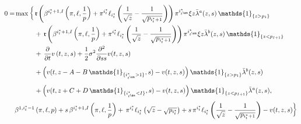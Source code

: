 \documentclass[8pt]{article}
\begin{document}
\begin{equation}
\begin{aligned}
    0 = & \max \bigg\{\,\mathfrak{r}\left( \beta^{i^\star_t+1,I} \left(\pi, \ell, \frac{1}{p} \right) + \pi^{i^\star_t} \ell_{i^\star_t}\left(\frac{1}{\sqrt{z}}-\frac{1}{\sqrt{p_{i^\star_t +1}}}\right) \right) \pi^{i^\star_{t^\sm}} \xi z \bar{\lambda}^a(z,s) \, \mathds{1}_{\{z > p_1\}} \bigg.\\
    & \qquad \quad \bigg. + \,\mathfrak{r}\left(\beta^{i^\star_t+1,I} \left(\pi, \ell, \frac{1}{p} \right) + \pi^{i^\star_t} \ell_{i^\star_t}\left(\frac{1}{\sqrt{z}}-\frac{1}{\sqrt{p_{i^\star_t +1}}}\right)\right) \pi^{i^\star_{t^\sm}} \xi z \bar{\lambda}^b(z,s) \, \mathds{1}_{\{z < p_{I+1}\}} \bigg. \nonumber \\
    & \qquad \quad \bigg. + \,\frac{\partial}{\partial t} v\left(t,z,s\right) + \frac{1}{2} \sigma^2 \frac{\partial^2}{\partial ss} v(t,z,s) \bigg. \\
    & \qquad \quad \bigg. + \left(v(t,z - A - B \, \mathds{1}_{\{i^\star_{t^\sm} > 1\}}, s) - v(t,z,s)\right) \mathds{1}_{\{z >p_1\}} \bar{\lambda}^b(z,s) \bigg. \\
    & \qquad \quad \bigg. + \left(v(t,z + C + D \, \mathds{1}_{\{i^\star_{t^\sm} < I\}}, s) - v(t,z,s)\right) \mathds{1}_{\{z <p_{I+1}\}} \bar{\lambda}^a(z,s), \\
    & \beta^{1,i^\star_{t} -1} \left(\pi, \ell, p\right) + s\,\beta^{i^\star_{t}+1, I} \left(\pi, \ell, \frac{1}{p} \right) +\, \pi^{i^\star_{t}} \ell_{i^\star_{t}}\left(\sqrt{z}-\sqrt{p_{i^\star_{t}}}\right) + s\,\pi^{i^\star_{t}} \ell_{i^\star_{t}}\left(\frac{1}{\sqrt{z}}-\frac{1}{\sqrt{p_{i^\star_{t} +1}}}\right) - v(t,z,s) \bigg\}
\end{aligned}
\end{equation}
\end{document}
